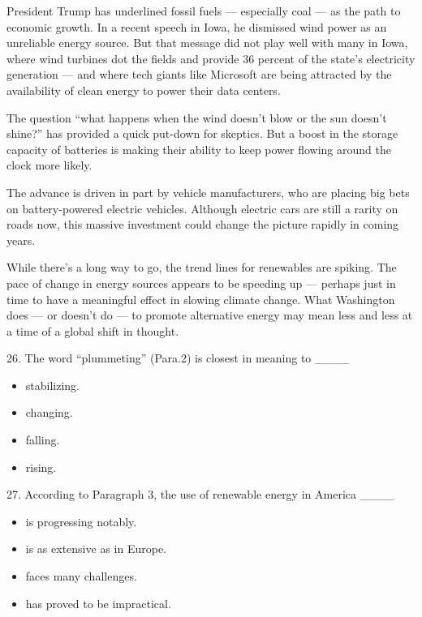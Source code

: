 \documentclass[UTF8,11pt]{ctexart}
\begin{document}
President Trump has underlined fossil fuels — especially coal — as the path to economic growth. In a recent speech in Iowa, he dismissed wind power as an unreliable energy source. But that message did not play well with many in Iowa, where wind turbines dot the fields and provide 36 percent of the state’s electricity generation — and where tech giants like Microsoft are being attracted by the availability of clean energy to power their data centers.


The question “what happens when the wind doesn’t blow or the sun doesn’t shine?” has provided a quick put-down for skeptics. But a boost in the storage capacity of batteries is making their ability to keep power flowing around the clock more likely.


The advance is driven in part by vehicle manufacturers, who are placing big bets on battery-powered electric vehicles. Although electric cars are still a rarity on roads now, this massive investment could change the picture rapidly in coming years.


While there’s a long way to go, the trend lines for renewables are spiking. The pace of change in energy sources appears to be speeding up — perhaps just in time to have a meaningful effect in slowing climate change. What Washington does — or doesn’t do — to promote alternative energy may mean less and less at a time of a global shift in thought.


26. The word “plummeting” (Para.2) is closest in meaning to \_\_\_\_


\begin{itemize}[leftmargin=2em,itemsep=.2em,topsep=.4em]\item[A.] stabilizing.
\item[B.] changing.
\item[C.] falling.
\item[D.] rising.
\end{itemize}

27. According to Paragraph 3, the use of renewable energy in America \_\_\_\_


\begin{itemize}[leftmargin=2em,itemsep=.2em,topsep=.4em]\item[A.] is progressing notably.
\item[B.] is as extensive as in Europe.
\item[C.] faces many challenges.
\item[D.] has proved to be impractical.
\end{itemize}
\end{document}
